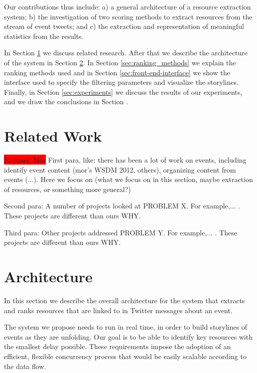 \documentclass{sig-alternate}
\newcommand{\todo}[1]{\colorbox{red}{#1}}
\begin{document}
Our contributions thus include: a) a general architecture of a resource extraction system; b) the investigation of two scoring methods to extract resources from the stream of event tweets; and c) the extraction and representation of meaningful statistics from the results.
 
In Section \ref{sec:related-work} we discuss related research. After that we describe the architecture of the system in Section \ref{sec:architecture}. In Section \ref{sec:ranking_methods} we explain the ranking methods used and in Section \ref{sec:front-end-interface} we show the interface used to specify the filtering parameters and visualize the storylines. Finally, in Section \ref{sec:experiments} we discuss the results of our experiments, and we draw the conclusions in Section \label{sec:conclusions}.


\section{Related Work}
\label{sec:related-work}

\todo{Raphael, Mor}
First para, like: there has been a lot of work on events, including identify event content (mor's WSDM 2012, others), organizing content from events (...). Here we focus on (what we focus on in this section, maybe extraction of resources, or something more general?)

Second para: A number of projects looked at PROBLEM X. For example,... . These projects are different than ours WHY.

Third para: Other projects addressed PROBLEM Y. For example,... . These projects are different than ours WHY.



\section{Architecture}
\label{sec:architecture}
In this section we describe the overall architecture for the system that extracts and ranks resources that are linked to in Twitter messages about an event. 

The system we propose needs to run in real time, in order to build storylines of events as they are unfolding. Our goal is to be able to identify key resources with the smallest delay possible. These requirements impose the adoption of an efficient, flexible concurrency process that would be easily scalable according to the data flow. 
\end{document}
